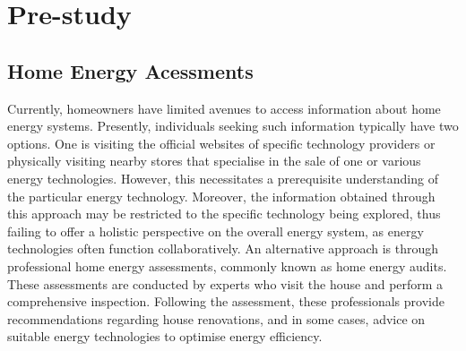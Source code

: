 \chapter{Pre-study} 






\section{Home Energy Acessments}

Currently, homeowners have limited avenues to access information about home energy systems. 
Presently, individuals seeking such information typically have two options. 
One is visiting the official websites of specific technology providers or physically visiting nearby stores that specialise in the sale of one or various energy technologies. 
However, this necessitates a prerequisite understanding of the particular energy technology.
Moreover, the information obtained through this approach may be restricted to the specific technology being explored, thus failing to offer a holistic perspective on the overall energy system, as energy technologies often function collaboratively.
An alternative approach is through professional home energy assessments, commonly known as home energy audits.
These assessments are conducted by experts who visit the house and perform a comprehensive inspection. 
Following the assessment, these professionals provide recommendations regarding house renovations, and in some cases, advice on suitable energy technologies to optimise energy efficiency.


